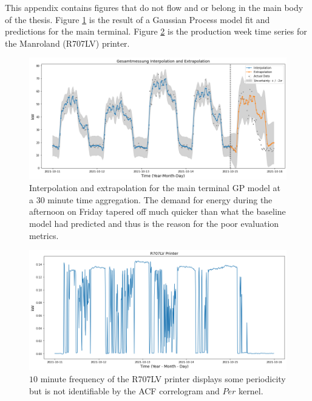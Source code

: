 This appendix contains figures that do not flow and or belong in the main body of the thesis. Figure \ref{fig:fig19} is the result of a Gaussian Process model fit and predictions for the main terminal. Figure \ref{fig:fig20} is the production week time series for the Manroland (R707LV) printer. 


\begin{figure}[h]
\centering
\graphicspath{ {./images/} }
\includegraphics[scale=0.49]{images/gesamtmessung_model.png}
\caption{Interpolation and extrapolation for the main terminal GP model at a $30$ minute time aggregation. The demand for energy during the afternoon on Friday tapered off much quicker than what the baseline model had predicted and thus is the reason for the poor evaluation metrics.}
\label{fig:fig19}
\end{figure}


\begin{figure}[H]
\centering
\graphicspath{ {./images/} }
\includegraphics[scale=0.49]{images/r707lv_printer.png}
\caption{$10$ minute frequency of the R707LV printer displays some periodicity but is not identifiable by the ACF correlogram and $Per$ kernel.}
\label{fig:fig20}
\end{figure}

